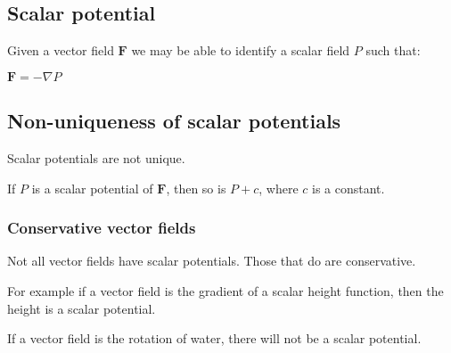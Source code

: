 
\subsection{Scalar potential}

Given a vector field \(\mathbf F\) we may be able to identify a scalar field \(P\) such that:

\(\mathbf F=-\nabla P\)

\subsection{Non-uniqueness of scalar potentials}

Scalar potentials are not unique.

If \(P\) is a scalar potential of \(\mathbf F\), then so is \(P+c\), where \(c\) is a constant.

\subsubsection{Conservative vector fields}

Not all vector fields have scalar potentials. Those that do are conservative.

For example if a vector field is the gradient of a scalar height function, then the height is a scalar potential.

If a vector field is the rotation of water, there will not be a scalar potential.


